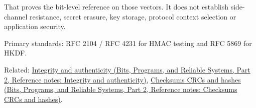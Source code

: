 That proves the bit-level reference on those vectors. It does not establish side-channel resistance, secret erasure, key storage, protocol context selection or application security.

Primary standards: RFC 2104 / RFC 4231 for HMAC testing and RFC 5869 for HKDF.

Related: \href{../01-Bits-Programs-and-Reliable-Systems-P02/main.pdf\#appendix-cbe594d1ab0a}{Integrity and authenticity (Bits, Programs, and Reliable Systems, Part 2, Reference notes: Integrity and authenticity)}, \href{../01-Bits-Programs-and-Reliable-Systems-P02/main.pdf\#appendix-ed338677de0a}{Checksums CRCs and hashes (Bits, Programs, and Reliable Systems, Part 2, Reference notes: Checksums CRCs and hashes)}.
